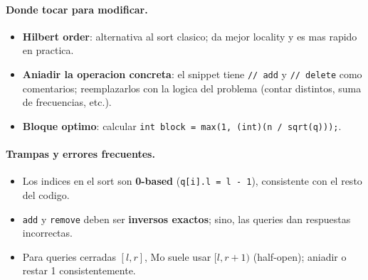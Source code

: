 \paragraph{Donde tocar para modificar.}
\begin{itemize}\setlength\itemsep{0pt}
	\item \textbf{Hilbert order}: alternativa al sort clasico; da mejor locality y es mas rapido en practica.
	\item \textbf{Aniadir la operacion concreta}: el snippet tiene \texttt{// add} y \texttt{// delete} como comentarios; reemplazarlos con la logica del problema (contar distintos, suma de frecuencias, etc.).
	\item \textbf{Bloque optimo}: calcular \texttt{int block = max(1, (int)(n / sqrt(q)));}.
\end{itemize}

\paragraph{Trampas y errores frecuentes.}
\begin{itemize}\setlength\itemsep{0pt}
	\item Los indices en el sort son \textbf{0-based} (\texttt{q[i].l = l - 1}), consistente con el resto del codigo.
	\item \texttt{add} y \texttt{remove} deben ser \textbf{inversos exactos}; sino, las queries dan respuestas incorrectas.
	\item Para queries cerradas $[l, r]$, Mo suele usar $[l, r+1)$ (half-open); aniadir o restar 1 consistentemente.
\end{itemize}

